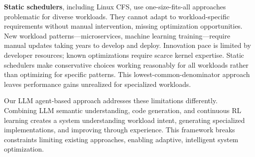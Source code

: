 \textbf{Static schedulers}, including Linux CFS, use one-size-fits-all approaches problematic for diverse workloads. They cannot adapt to workload-specific requirements without manual intervention, missing optimization opportunities. New workload patterns—microservices, machine learning training—require manual updates taking years to develop and deploy. Innovation pace is limited by developer resources; known optimizations require scarce kernel expertise. Static schedulers make conservative choices working reasonably for all workloads rather than optimizing for specific patterns. This lowest-common-denominator approach leaves performance gains unrealized for specialized workloads.

Our LLM agent-based approach addresses these limitations differently. Combining LLM semantic understanding, code generation, and continuous RL learning creates a system understanding workload intent, generating specialized implementations, and improving through experience. This framework breaks constraints limiting existing approaches, enabling adaptive, intelligent system optimization.